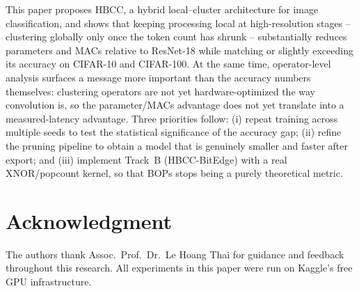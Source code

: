 \documentclass[journal]{IEEEtran}
\begin{document}
This paper proposes HBCC, a hybrid local--cluster architecture for image classification, and shows that keeping processing local at high-resolution stages -- clustering globally only once the token count has shrunk -- substantially reduces parameters and MACs relative to ResNet-18 while matching or slightly exceeding its accuracy on CIFAR-10 and CIFAR-100. At the same time, operator-level analysis surfaces a message more important than the accuracy numbers themselves: clustering operators are not yet hardware-optimized the way convolution is, so the parameter/MACs advantage does not yet translate into a measured-latency advantage. Three priorities follow: (i) repeat training across multiple seeds to test the statistical significance of the accuracy gap; (ii) refine the pruning pipeline to obtain a model that is genuinely smaller and faster after export; and (iii) implement Track~B (HBCC-BitEdge) with a real XNOR/popcount kernel, so that BOPs stops being a purely theoretical metric.

\section*{Acknowledgment}
The authors thank Assoc.\ Prof.\ Dr.\ Le Hoang Thai for guidance and feedback throughout this research. All experiments in this paper were run on Kaggle's free GPU infrastructure.



\end{document}

